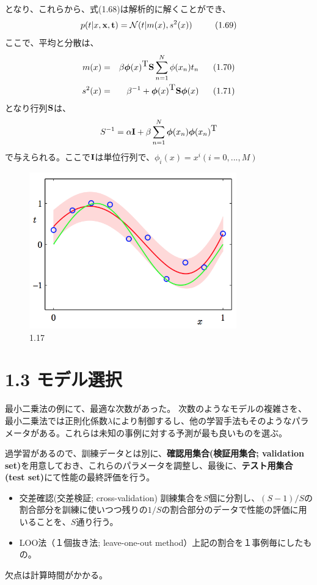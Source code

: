 \documentclass{jsarticle}
\def\N{{\mathcal{N}}}
\def\p{{\bm{\phi}}}
\def\t{{\mbox{\bf t}}}
\def\x{{\mbox{\bf x}}}
\def\T{{\mbox{T}}}
\def\S{{\mbox{\bf S}}}
\def\I{{\mbox{\bf I}}}
\begin{document}
となり、これらから、式(1.68)は解析的に解くことができ、
\[
p(t|x,\x,\t) = \N(t|m(x),s^2(x))  \ \ \ \ \ \ \ \ (1.69)
\]
ここで、平均と分散は、
\begin{eqnarray*}
  m(x) & = &\beta\p(x)^{\T}\S\sum_{n=1}^{N}\phi(x_n)t_n \ \ \ \ \ (1.70) \\
  s^2(x) & = & \beta^{-1} + \p(x)^{\T}\S\p(x) \ \ \ \ \ (1.71)
\end{eqnarray*}
となり行列$\S$は、
\begin{eqnarray*}
  S^{-1} = \alpha\I+\beta\sum_{n=1}^{N}\p(x_n)\p(x_n)^\T
\end{eqnarray*}
で与えられる。ここで$\I$は単位行列で、$\phi_i(x) = x^i (i=0,...,M)$

\begin{figure}
  \centering
  \includegraphics[width=0.8\textwidth]{f1-17.png}
  \caption{1.17}
\end{figure}

\section{1.3 モデル選択}

最小二乗法の例にて、最適な次数があった。
次数のようなモデルの複雑さを、最小二乗法では正則化係数$\lambda$により制御するし、他の学習手法もそのようなパラメータがある。これらは未知の事例に対する予測が最も良いものを選ぶ。

過学習があるので、訓練データとは別に、{\bf 確認用集合(検証用集合; validation set)}を用意しておき、これらのパラメータを調整し、最後に、{\bf テスト用集合(test set)}にて性能の最終評価を行う。

\begin{itemize}
\item 交差確認(交差検証; cross-validation) 訓練集合を$S$個に分割し、$(S-1)/S$の割合部分を訓練に使いつつ残りの$1/S$の割合部分のデータで性能の評価に用いることを、$S$通り行う。
\item LOO法（１個抜き法; leave-one-out method）上記の割合を１事例毎にしたもの。
\end{itemize}
欠点は計算時間がかかる。
\end{document}
